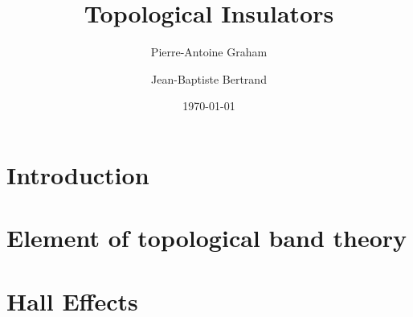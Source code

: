 




\title{Topological Insulators} 

\author{Pierre-Antoine Graham}
\author{Jean-Baptiste Bertrand}


\date{\today}

\begin{abstract}

\end{abstract}

\maketitle

\tableofcontents



\section{\label{sec:intro} Introduction}


\section{\label{sec:kramers} Element of topological band theory}


\section{\label{sec:QSH} Hall Effects}






